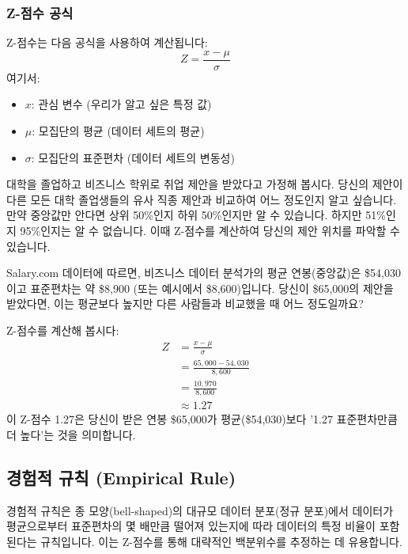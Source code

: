 \documentclass[11pt,a4paper]{article}
\theoremstyle{definition}
\begin{document}
\subsubsection*{Z-점수 공식}
Z-점수는 다음 공식을 사용하여 계산됩니다:
\[ Z = \frac{x - \mu}{\sigma} \]
여기서:
\begin{itemize}
    \item \(x\): 관심 변수 (우리가 알고 싶은 특정 값)
    \item \(\mu\): 모집단의 평균 (데이터 세트의 평균)
    \item \(\sigma\): 모집단의 표준편차 (데이터 세트의 변동성)
\end{itemize}

\begin{examplebox}[title=Z-점수 예시: 연봉 비교]
대학을 졸업하고 비즈니스 학위로 취업 제안을 받았다고 가정해 봅시다. 당신의 제안이 다른 모든 대학 졸업생들의 유사 직종 제안과 비교하여 어느 정도인지 알고 싶습니다. 만약 중앙값만 안다면 상위 50\%인지 하위 50\%인지만 알 수 있습니다. 하지만 51\%인지 95\%인지는 알 수 없습니다. 이때 Z-점수를 계산하여 당신의 제안 위치를 파악할 수 있습니다.

Salary.com 데이터에 따르면, 비즈니스 데이터 분석가의 평균 연봉(중앙값)은 \$54,030이고 표준편차는 약 \$8,900 (또는 예시에서 \$8,600)입니다. 당신이 \$65,000의 제안을 받았다면, 이는 평균보다 높지만 다른 사람들과 비교했을 때 어느 정도일까요?

Z-점수를 계산해 봅시다:
\begin{align*} Z &= \frac{x - \mu}{\sigma} \\ &= \frac{65,000 - 54,030}{8,600} \\ &= \frac{10,970}{8,600} \\ &\approx 1.27 \end{align*}
이 Z-점수 1.27은 당신이 받은 연봉 \$65,000가 평균(\$54,030)보다 '1.27 표준편차만큼 더 높다'는 것을 의미합니다.
\end{examplebox}

\newpage
\subsection{경험적 규칙 (Empirical Rule)}

\begin{summarybox}[title=경험적 규칙 핵심 요약]
경험적 규칙은 종 모양(bell-shaped)의 대규모 데이터 분포(정규 분포)에서 데이터가 평균으로부터 표준편차의 몇 배만큼 떨어져 있는지에 따라 데이터의 특정 비율이 포함된다는 규칙입니다. 이는 Z-점수를 통해 대략적인 백분위수를 추정하는 데 유용합니다.
\end{summarybox}
\end{document}
